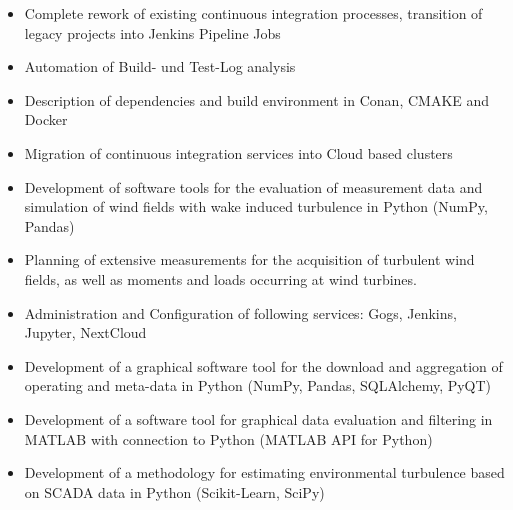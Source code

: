 \documentclass[10pt,a4paper,ragged2e,normalphoto]{altacv}
\begin{document}

  \begin{fullwidth}
    \makecvheader
  \end{fullwidth}

      \begin{itemize}
        \item Complete rework of existing continuous integration processes, transition of legacy projects into Jenkins Pipeline Jobs \\
        \item Automation of Build- und Test-Log analysis \\
        \item Description of dependencies and build environment in Conan, CMAKE and Docker \\
        \item Migration of continuous integration services into Cloud based clusters \\
      \end{itemize}
    \divider

      \begin{itemize}
        \item Development of software tools for the evaluation of measurement data and simulation of wind fields with wake induced turbulence in Python (NumPy, Pandas) \\
        \item Planning of extensive measurements for the acquisition of turbulent wind fields, as well as moments and loads occurring at wind turbines. \\
        \item Administration and Configuration of following services: Gogs, Jenkins, Jupyter, NextCloud \\
      \end{itemize}
    \divider

      \begin{itemize}
        \item Development of a graphical software tool for the download and aggregation of operating and meta-data in Python (NumPy, Pandas, SQLAlchemy, PyQT) \\
        \item Development of a software tool for graphical data evaluation and filtering in MATLAB with connection to Python (MATLAB API for Python) \\
        \item Development of a methodology for estimating environmental turbulence based on SCADA data in Python (Scikit-Learn, SciPy) \\
      \end{itemize}
\end{document}
